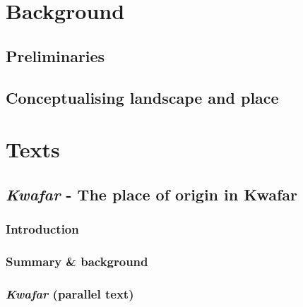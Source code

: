 \documentclass[output=book,
		  ]{langscibook}
\begin{document}

\maketitle
\frontmatter
{} %
{\sloppy\tableofcontents}
% 
    
    
\mainmatter

\part{Background}
\chapter{Preliminaries}\label{chapter:prelim}
    
\chapter{Conceptualising landscape and place}\label{chapter:space}
    

\part{Texts}
    \renewcommand{\thechapter}{\Alph{chapter}}
    \setcounter{chapter}{0}
\chapter{\textit{Kwafar} - The place of origin in Kwafar}\label{text:kwafar}
\section{Introduction}
    
\section{Summary \& background}
    
    \vspace{-.3cm}
\section{\textit{Kwafar} (parallel text)}
    
    \newpage
\end{document}
